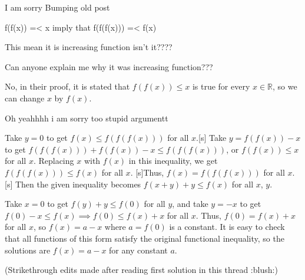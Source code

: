 \begin{solution}
	I am sorry Bumping old post 

f(f(x)) =< x imply that f(f(f(x))) =< f(x)

This mean it is increasing function isn't it????

Can anyone explain me why it was increasing function???
\end{solution}



\begin{solution}
	No, in their proof, it is stated that $f(f(x)) \le x$ is true for every $x \in \mathbb{R}$, so we can change $x$ by $f(x)$.
\end{solution}



\begin{solution}
	Oh yeahhhh i am sorry too stupid argumentt
\end{solution}



\begin{solution}Take $y=0$ to get $f(x) \le f(f(f(x)))$ for all $x$.[\/s] Take $y = f(f(x)) - x$ to get $f(f(f(x))) + f(f(x)) - x \le f(f(f(x)))$, or $f(f(x)) \le x$ for all $x$. Replacing $x$ with $f(x)$ in this inequality, we get $f(f(f(x))) \le f(x)$ for all $x$. [s]Thus, $f(x) = f(f(f(x)))$ for all $x$.[\/s] Then the given inequality becomes $f(x+y) + y \le f(x)$ for all $x$, $y$.

Take $x=0$ to get $f(y) + y \le f(0)$ for all $y$, and take $y=-x$ to get $f(0) - x \le f(x) \implies f(0) \le f(x) + x$ for all $x$. Thus, $f(0) = f(x) + x$ for all $x$, so $f(x) = a-x$ where $a=f(0)$ is a constant. It is easy to check that all functions of this form satisfy the original functional inequality, so the solutions are $f(x) = a-x$ for any constant $a$.

(Strikethrough edits made after reading first solution in this thread :blush:)
\end{solution}



